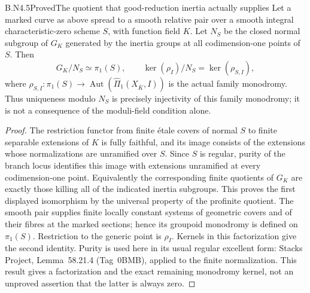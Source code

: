 \begin{claim}{B.N4.5}{Proved}{The quotient that good-reduction inertia actually supplies}
Let a marked curve as above spread to a smooth relative pair over a
smooth integral characteristic-zero scheme $S$, with function field
$K$.  Let $N_S$ be the closed normal subgroup of $G_K$ generated by
the inertia groups at all codimension-one points of $S$.  Then
\[
 G_K/N_S\simeq\pi_1(S),\qquad
 \ker(\rho_I)/N_S=\ker(\rho_{S,I}),
\]
where $\rho_{S,I}:\pi_1(S)\to\operatorname{Aut}
(\widehat\Pi_1(X_{\overline K},I))$ is the actual family monodromy.
Thus uniqueness modulo $N_S$ is precisely injectivity of this family
monodromy; it is not a consequence of the moduli-field condition alone.
\end{claim}
\begin{proof}
The restriction functor from finite \'etale covers of normal $S$ to
finite separable extensions of $K$ is fully faithful, and its image
consists of the extensions whose normalizations are unramified over
$S$.  Since $S$ is regular, purity of the branch locus identifies this
image with extensions unramified at every codimension-one point.
Equivalently the corresponding finite quotients of $G_K$ are exactly
those killing all of the indicated inertia subgroups.  This proves the
first displayed isomorphism by the universal property of the profinite
quotient.  The smooth pair supplies finite locally constant systems of
geometric covers and of their fibres at the marked sections; hence its
groupoid monodromy is defined on $\pi_1(S)$.  Restriction to the generic
point is $\rho_I$.  Kernels in this factorization give the second
identity.  Purity is used here in its usual regular excellent form:
Stacks Project, Lemma~58.21.4 (Tag~0BMB), applied to the finite
normalization.  This result gives a factorization and the exact
remaining monodromy kernel, not an unproved assertion that the latter
is always zero.
\end{proof}

